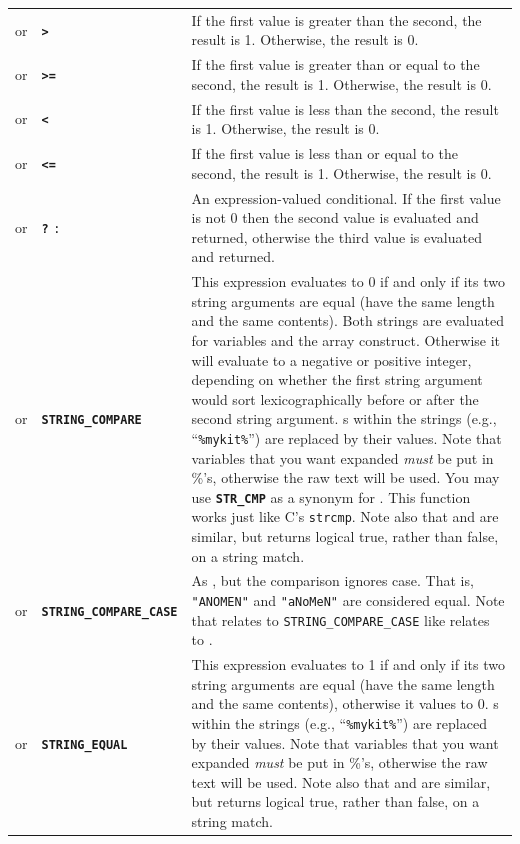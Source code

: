 \documentclass{article}
\def\ttref#1{\ahrefloc{#1}{\tt #1}}
\def\DEFINE#1{{\tt \bf #1}\label{#1}\index{#1}}
\def\DEFSYN#1{{\tt \bf #1}\index{#1}}
\def\t#1{{\tt #1}}
\begin{document}
\begin{tabular}{cp{10in}|p{10in}}
or & \ttref{value} \DEFSYN{>} \ttref{value} & If the first value is
greater than the second, the result is 1. Otherwise, the result is 0. \\
or & \ttref{value} \DEFSYN{>=} \ttref{value} & If the first value is
greater than or equal to the second, the result is 1. Otherwise, the result
is 0. \\
or & \ttref{value} \DEFSYN{<} \ttref{value} & If the first value is
less than the second, the result is 1. Otherwise, the result
is 0. \\
or & \ttref{value} \DEFSYN{<=} \ttref{value} & If the first value is
less than or equal to the second, the result is 1. Otherwise, the result
is 0. \\
or & \ttref{value} \DEFSYN{?} \ttref{value} \t{:} \ttref{value} &
An expression-valued conditional.  If the first value is not 0 then the
second value is evaluated and returned, otherwise the third value is
evaluated and returned.  \\

or & \ttref{String} \DEFINE{STRING_COMPARE} \ttref{String} &
This expression evaluates to 0 if and only if its two string arguments
are equal (have the same length and the same contents). Both strings
are evaluated for variables and the array construct. Otherwise it will
evaluate to a negative or positive integer, depending on whether the
first string argument would sort lexicographically before or after the
second string argument.  \ttref{variable}s within the strings (e.g.,
``\t{\%mykit\%}'') are replaced by their values. Note that variables
that you want expanded \emph{must} be put in \%'s, otherwise the raw
text will be used.  You may use \DEFINE{STR_CMP} as a synonym for
\ttref{STRING_COMPARE}. This function works just like C's \t{strcmp}.
Note also that \ttref{STRING_EQUAL} and \ttref{STRING_COMPARE} are
similar, but \ttref{STRING_EQUAL} returns logical true, rather than
false, on a string match. \\

or & \ttref{String} \DEFINE{STRING_COMPARE_CASE} \ttref{String} &
As \ttref{STRING_COMPARE}, but the comparison ignores case. That is,
\t{"ANOMEN"} and \t{"aNoMeN"} are considered equal. Note that
\ttref{STRING_EQUAL_CASE} relates to \t{STRING_COMPARE_CASE} like
\ttref{STRING_EQUAL} relates to \ttref{STRING_COMPARE}. \\

or & \ttref{String} \DEFINE{STRING_EQUAL} \ttref{String} &
This expression evaluates to 1 if and only if its two string arguments are
equal (have the same length and the same contents), otherwise it values to 0.
\ttref{variable}s within the strings (e.g., ``\t{\%mykit\%}'') are replaced
by their values.
Note that variables that you want expanded \emph{must} be put in \%'s,
otherwise the raw text will be used.
Note also that \ttref{STRING_EQUAL} and \ttref{STRING_COMPARE} are
similar, but \ttref{STRING_EQUAL} returns logical true, rather than
false, on a string match. \\


\end{tabular}
\end{document}

